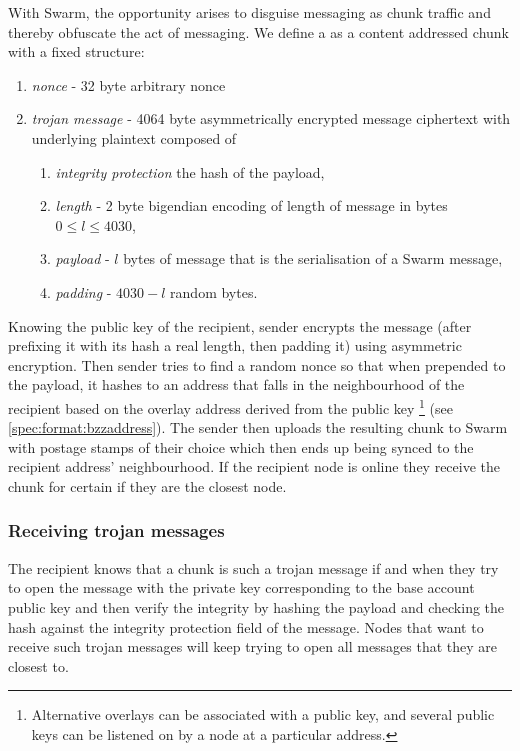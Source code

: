 With Swarm, the opportunity arises to disguise messaging as chunk traffic and thereby obfuscate the act of messaging. We define a  as a content addressed chunk with a fixed structure:

\begin{enumerate}
    \item \emph{nonce} - 32 byte arbitrary nonce 
    \item \emph{trojan message} - 4064 byte asymmetrically encrypted message ciphertext with underlying plaintext composed of
    \begin{enumerate}
        \item \emph{integrity protection} the hash of the payload, 
        \item \emph{length} - 2 byte bigendian encoding of length of message in bytes $0\leq l\leq 4030$,
        \item \emph{payload} - $l$ bytes of message that is the serialisation of a Swarm message,
        \item \emph{padding} - $4030-l$ random bytes.
    \end{enumerate}
\end{enumerate}

Knowing the public key of the recipient, sender encrypts the message (after prefixing it with its hash a real length, then padding it) using asymmetric encryption. Then sender tries to find a random nonce so that when prepended to the payload, it hashes to an address that falls in the neighbourhood of the recipient based on the overlay address derived from the public key%
%
\footnote{Alternative overlays can be associated with a public key, and several public keys can be listened on by a node at a particular address.}
%
(see \ref{spec:format:bzzaddress}). The sender then uploads the resulting chunk to Swarm with postage stamps of their choice which then ends up being synced to the recipient address' neighbourhood. If the recipient node is online they receive the chunk for certain if they are the closest node. 

\subsubsection{Receiving trojan messages}

The recipient knows that a chunk is such a trojan message if and when they try to open the message with the private key corresponding to the base account public key and then verify the integrity by hashing the payload and checking the hash against the integrity protection field of the message. Nodes that want to receive such trojan messages will keep trying to open all messages that they are closest to.

